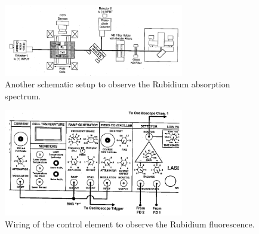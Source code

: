 \begin{figure}
  \centering
  \includegraphics[width=0.7\textwidth]{setup3.png}
  \caption{Another schematic setup to observe the Rubidium absorption spectrum.\cite{V60}}
  \label{fig:setup3}
\end{figure}


\begin{figure}
  \centering
  \includegraphics[width=0.7\textwidth]{wiring2.png}
  \caption{Wiring of the control element to observe the Rubidium fluorescence.\cite{V60}}
  \label{fig:dl_controll2}
\end{figure}

